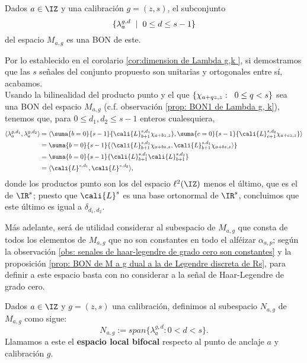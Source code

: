 \begin{prop} \label{prop: BON de M a g dual a la de Legendre discreta de Rs}
Dados $a \in \IZ$ y una calibración $g=(z,s)$, 
el subconjunto 
\[
\{ \lambda_{a}^{g,d} \hspace{0.2cm} | \hspace{0.2cm} 0 \leq d \leq s-1 \}
\]
del espacio $M_{a,g}$
es una BON de este. 
\end{prop}
\begin{dem} Por lo establecido en 
el corolario \ref{cor:dimension de Lambda g,k },
si demostramos que las $s$ señales 
del conjunto propuesto
son unitarias
y ortogonales entre sí, acabamos. \\
Usando la bilinealidad del producto punto y el que 
$\{ \chi_{a+qz, z}: \hspace{0.2cm} 0 \leq q <s \}$
sea una BON del espacio $M_{a,g}$ (c.f.
observación \ref{prop: BON1 de Lambda g, k}),
tenemos que, para $0 \leq d_{1}, d_{2} \leq s-1$
enteros cualesquiera,
\begin{align*}
\langle \lambda_{a}^{g,d_{1}} , \lambda_{a}^{g,d_{2}} \rangle 
& = \langle \suma{b=0}{s-1}{\cali{L}_{b+1}^{s,d_{1}} \chi _{a+bz,z} },
 \suma{c=0}{s-1}{\cali{L}_{c+1}^{s,d_{2}} \chi _{a+cz,z} } \rangle \\
& =\suma{b=0}{s-1}{\langle \cali{L}_{b+1}^{s,d_{1}} \chi _{a+bz,z},
\cali{L}_{b+1}^{s,d_{1}} \chi _{a+bz,z} \rangle }\\
& = \suma{b=0}{s-1}{\cali{L}_{b+1}^{s,d_{1}} \cali{L}_{b+1}^{s,d_{2}}} \\
& =\langle \cali{L}^{s,d_{1}} , \cali{L}^{s,d_{2}} \rangle,
\end{align*}
\noindent 
donde los productos punto son los del espacio 
$\ell^{2}(\IZ)$ menos el último, que es el de 
$\IR^{s}$; puesto que $\cali{L}^{s}$ es una
base ortonormal de $\IR^{s}$, concluimos 	que este 
último es igual a $\delta_{d_{1}, d_{2}}$.

\QEDB
\end{dem}

Más adelante, será de utilidad considerar al subespacio
de $M_{a,g}$ que consta de todos los elementos
de $M_{a,g}$ que no son constantes en todo el alféizar
$\alpha_{a, p}$; según la observación 
\ref{obs: senales de haar-legendre de grado cero son constantes}
y la proposición
\ref{prop: BON de M a g dual a la de Legendre discreta de Rs},
para definir a este espacio basta con no considerar a la 
señal de Haar-Legendre de grado cero.

\begin{defi}
\label{espacios N_{a,g}} Dados $a \in \IZ$ y $g=(z,s)$
una calibración, definimos al subespacio $N_{a,g}$
de $M_{a,g}$ como sigue:
\[
N_{a,g}:= span \{ \lambda_{a}^{g,d}: 0 < d < s \}.
\]
Llamamos a este el \textbf{espacio local bifocal}
respecto al punto de anclaje $a$ y calibración $g$.
\end{defi} 



